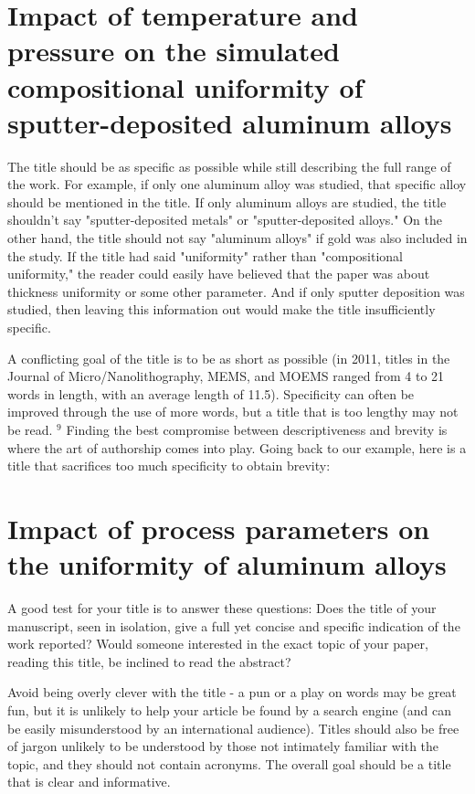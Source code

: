 \section*{Impact of temperature and pressure on the simulated compositional uniformity of sputter-deposited aluminum alloys}
The title should be as specific as possible while still describing the full range of the work. For example, if only one aluminum alloy was studied, that specific alloy should be mentioned in the title. If only aluminum alloys are studied, the title shouldn't say "sputter-deposited metals" or "sputter-deposited alloys." On the other hand, the title should not say "aluminum alloys" if gold was also included in the study. If the title had said "uniformity" rather than "compositional uniformity," the reader could easily have believed that the paper was about thickness uniformity or some other parameter. And if only sputter deposition was studied, then leaving this information out would make the title insufficiently specific.

A conflicting goal of the title is to be as short as possible (in 2011, titles in the Journal of Micro/Nanolithography, MEMS, and MOEMS ranged from 4 to 21 words in length, with an average length of 11.5). Specificity can often be improved through the use of more words, but a title that is too lengthy may not be read. ${ }^{9}$ Finding the best compromise between descriptiveness and brevity is where the art of authorship comes into play. Going back to our example, here is a title that sacrifices too much specificity to obtain brevity:

\section*{Impact of process parameters on the uniformity of aluminum alloys}
A good test for your title is to answer these questions: Does the title of your manuscript, seen in isolation, give a full yet concise and specific indication of the work reported? Would someone interested in the exact topic of your paper, reading this title, be inclined to read the abstract?

Avoid being overly clever with the title - a pun or a play on words may be great fun, but it is unlikely to help your article be found by a search engine (and can be easily misunderstood by an international audience). Titles should also be free of jargon unlikely to be understood by those not intimately familiar with the topic, and they should not contain acronyms. The overall goal should be a title that is clear and informative.

